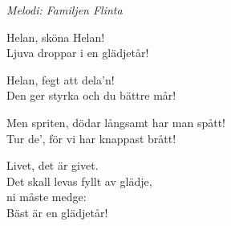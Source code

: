 {\footnotesize\textit{Melodi: Familjen Flinta}}\par
\vspace{10pt}
Helan, sköna Helan!\\
Ljuva droppar i en glädjetår!\par
\vspace{10pt}
Helan, fegt att dela'n!\\
Den ger styrka och du bättre mår!\par
\vspace{10pt}
Men spriten, dödar långsamt har man spått!\\
Tur de', för vi har knappast brått!\par
\vspace{10pt}
Livet, det är givet.\\
Det skall levas fyllt av glädje,\\
ni måste medge:\\
Bäst är en glädjetår!
